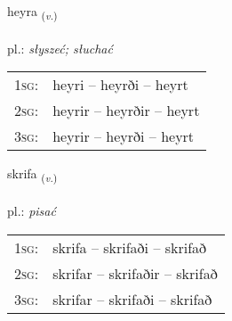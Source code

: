 \documentclass[frontgrid, backgrid]{flacards}\usepackage[]{graphicx}\usepackage[]{xcolor}
\begin{document}
\renewcommand{\flhead}{\vskip5pt \fboxsep=0pt {\small\bfseries\footnotesize Sagnorð | Verb}}
\renewcommand{\fcfoot}{\vskip5pt \fboxsep=0pt \hspace{2pt}{\small\bfseries\footnotesize 1K}}

\renewcommand{\blhead}{\vskip5pt {\small\bfseries\footnotesize Sagnorð | Verb }}
\renewcommand{\bcfoot}{\vskip5pt \hspace{2pt}{\small\bfseries\footnotesize 1K}}


{heyra \small{\textsubscript{(\textit{v.})}} \\[1ex] %
\textphonetic{[heiːra]} \\
pl.: \emph{słyszeć; słuchać} \\  [2ex]
\renewcommand*{\arraystretch}{0.8}
\begin{tabular}{p{1cm}l}
\textsc{1sg}: & heyri -- heyrði -- heyrt \\ 
\textsc{2sg}: & heyrir -- heyrðir -- heyrt \\ 
\textsc{3sg}: & heyrir -- heyrði -- heyrt \\ 
\end{tabular}
}

\renewcommand{\flhead}{\vskip5pt \fboxsep=0pt {\small\bfseries\footnotesize Sagnorð | Verb}}
\renewcommand{\fcfoot}{\vskip5pt \fboxsep=0pt \hspace{2pt}{\small\bfseries\footnotesize 1K}}

\renewcommand{\blhead}{\vskip5pt {\small\bfseries\footnotesize Sagnorð | Verb }}
\renewcommand{\bcfoot}{\vskip5pt \hspace{2pt}{\small\bfseries\footnotesize 1K}}


{skrifa \small{\textsubscript{(\textit{v.})}} \\[1ex] %
\textphonetic{[skrɪːva]} \\
pl.: \emph{pisać} \\  [2ex]
\renewcommand*{\arraystretch}{0.8}
\begin{tabular}{p{1cm}l}
\textsc{1sg}: & skrifa -- skrifaði -- skrifað \\ 
\textsc{2sg}: & skrifar -- skrifaðir -- skrifað \\ 
\textsc{3sg}: & skrifar -- skrifaði -- skrifað \\ 
\end{tabular}
}
\end{document}
